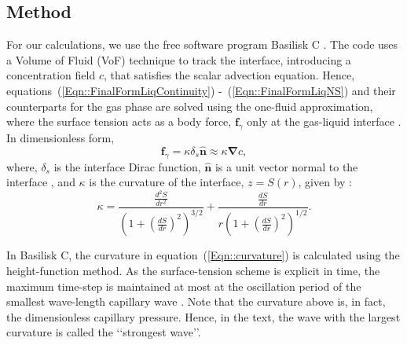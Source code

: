\documentclass[final]{jfm}
\begin{document}
\subsection{Method}\label{Sec::Method}
For our calculations, we use the free software program Basilisk C \citep{basiliskPopinet, popinet2015quadtree}.  The code uses a Volume of Fluid (VoF) technique \citep{tryggvason2011direct} to track the interface, introducing a concentration field $c$, that satisfies the scalar advection equation. Hence, equations~(\ref{Eqn::FinalFormLiqContinuity}) -~(\ref{Eqn::FinalFormLiqNS}) and their counterparts for the gas phase are solved using the one-fluid approximation, where the surface tension acts as a body force, $\boldsymbol{f}_\gamma$ only at the gas-liquid interface \citep{brackbill1992continuum, popinet2009accurate}. In dimensionless form,
\begin{equation}\label{Eqn::SurfaceTension}
	\boldsymbol{f}_\gamma = \kappa\delta_s\hat{\boldsymbol{n}} \approx \kappa\boldsymbol{\nabla}c,
\end{equation}
%
where, $\delta_s$ is the interface Dirac function, $\hat{\boldsymbol{n}}$ is a unit vector normal to the interface \citep{tryggvason2011direct}, and $\kappa$ is the curvature of the interface, $z = S(r)$, given by \citet[p.~14-16]{deserno2004notes}:
\begin{equation}\label{Eqn::curvature}
	\kappa = \frac{\frac{d^2S}{dr^2}}{\left(1 + \left(\frac{dS}{dr}\right)^2\right)^{3/2}} + \frac{\frac{dS}{dr}}{r\left(1 + \left(\frac{dS}{dr}\right)^2\right)^{1/2}}.
\end{equation}

In Basilisk C, the curvature in equation~(\ref{Eqn::curvature}) is calculated using the height-function method.  As the surface-tension scheme is explicit in time, the maximum time-step is maintained at most at the oscillation period of the smallest wave-length capillary wave \citep{popinet2009accurate, basiliskPopinet2}.
Note that the curvature above is, in fact, the dimensionless capillary pressure. Hence, in the text, the wave with the largest curvature is called the \lq\lq strongest wave\rq\rq.
\end{document}
